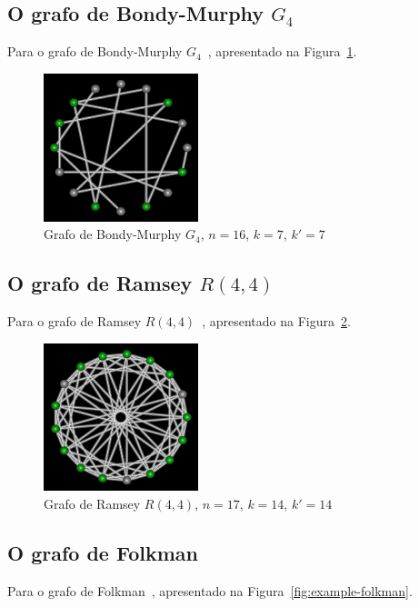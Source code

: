 \subsection{O grafo de Bondy-Murphy $G_4$}
Para o grafo de Bondy-Murphy $G_4$~\cite{cite:example-bondy},
apresentado na Figura~\ref{fig:example-bondymurphyg4}.

\begin{figure}[htb]
\centering
\includegraphics[width=0.4\textwidth]{img/bondymurphyg4.png}
\caption{Grafo de Bondy-Murphy $G_4$, $n=16$, $k=7$, $k'=7$}
\label{fig:example-bondymurphyg4}
\end{figure}


\subsection{O grafo de Ramsey $R(4,4)$}
Para o grafo de Ramsey $R(4,4)$~\cite{cite:example-ramsey},
apresentado na Figura~\ref{fig:example-ramsey}.

\begin{figure}[htb]
\centering
\includegraphics[width=0.4\textwidth]{img/ramsey.png}
\caption{Grafo de Ramsey $R(4,4)$, $n=17$, $k=14$, $k'=14$}
\label{fig:example-ramsey}
\end{figure}


\subsection{O grafo de Folkman}
Para o grafo de Folkman~\cite{cite:example-folkman},
apresentado na Figura~\ref{fig:example-folkman}.

